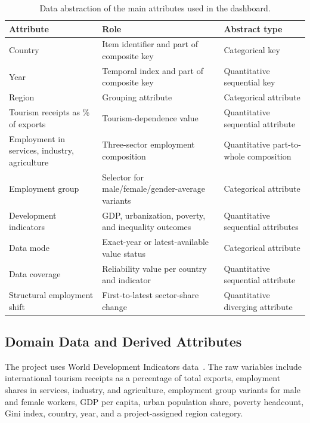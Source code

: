 \documentclass{vgtc}
\begin{document}
\begin{table}[t]
    \centering
    \caption{Data abstraction of the main attributes used in the dashboard.}
    \label{tab:data-abstraction}
    \footnotesize
    \setlength{\tabcolsep}{4pt}
    \renewcommand{\arraystretch}{1.12}
    \begin{tabular}{p{} p{} p{}}
        \toprule
        \textbf{Attribute} & \textbf{Role} & \textbf{Abstract type} \\
        \midrule
        Country & Item identifier and part of composite key & Categorical key \\
        Year & Temporal index and part of composite key & Quantitative sequential key \\
        Region & Grouping attribute & Categorical attribute \\
        Tourism receipts as \% of exports & Tourism-dependence value & Quantitative sequential attribute \\
        Employment in services, industry, agriculture & Three-sector employment composition & Quantitative part-to-whole composition \\
        Employment group & Selector for male/female/gender-average variants & Categorical attribute \\
        Development indicators & GDP, urbanization, poverty, and inequality outcomes & Quantitative sequential attributes \\
        Data mode & Exact-year or latest-available value status & Categorical attribute \\
        Data coverage & Reliability value per country and indicator & Quantitative sequential attribute \\
        Structural employment shift & First-to-latest sector-share change & Quantitative diverging attribute \\
        \bottomrule
    \end{tabular}
\end{table}

\subsection{Domain Data and Derived Attributes}

The project uses World Development Indicators data~\cite{wdi}. The raw variables include international tourism receipts as a percentage of total exports, employment shares in services, industry, and agriculture, employment group variants for male and female workers, GDP per capita, urban population share, poverty headcount, Gini index, country, year, and a project-assigned region category.
\end{document}
